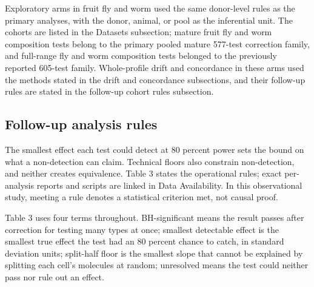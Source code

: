 \documentclass[11pt]{article}
\begin{document}
Exploratory arms in fruit fly and worm used the same donor-level rules as the primary analyses, with the donor, animal, or pool as the inferential unit. The cohorts are listed in the Datasets subsection; mature fruit fly and worm composition tests belong to the primary pooled mature 577-test correction family, and full-range fly and worm composition tests belonged to the previously reported 605-test family. Whole-profile drift and concordance in these arms used the methods stated in the drift and concordance subsections, and their follow-up rules are stated in the follow-up cohort rules subsection.

\subsection*{Follow-up analysis rules}

The smallest effect each test could detect at 80 percent power sets the bound on what a non-detection can claim. Technical floors also constrain non-detection, and neither creates equivalence. Table 3 states the operational rules; exact per-analysis reports and scripts are linked in Data Availability. In this observational study, meeting a rule denotes a statistical criterion met, not causal proof.


Table 3 uses four terms throughout. BH-significant means the result passes after correction for testing many types at once; smallest detectable effect is the smallest true effect the test had an 80 percent chance to catch, in standard deviation units; split-half floor is the smallest slope that cannot be explained by splitting each cell's molecules at random; unresolved means the test could neither pass nor rule out an effect.
\end{document}
